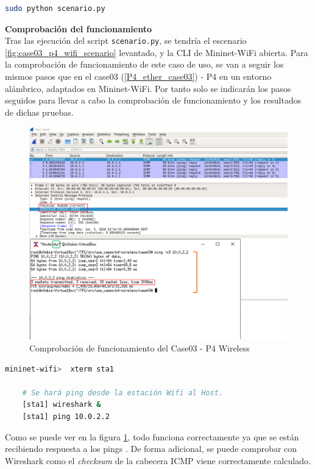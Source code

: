 \begin{lstlisting}[language= bash, style=Consola, caption={Puesta en marcha del escenario  - Case03},label=code:case03_p4_wifi_run]
    sudo python scenario.py
\end{lstlisting}

\vspace{0.4cm}
\textbf{Comprobación del funcionamiento}\\


Tras las ejecución del script \texttt{scenario.py}, se tendría el escenario \ref{fig:case03_p4_wifi_scenario} levantado, y la CLI de Mininet-WiFi abierta. Para la comprobación de funcionamiento de este caso de uso, se van a seguir los mismos pasos que en el case03 (\ref{P4_ether_case03}) - P4 en un entorno alámbrico, adaptados en Mininet-WiFi. Por tanto solo se indicarán los pasos seguidos para llevar a cabo la comprobación de funcionamiento y los resultados de dichas pruebas. 

\begin{figure}[ht]
    \centering
    \includegraphics[width=14cm]{archivos/img/dev/p4-wifi/case03/demo_case03_edited.png}
    \caption{Comprobación de funcionamiento del Case03 - P4 Wireless}
    \label{fig:case03_p4_wifi_func1}
\end{figure}

\begin{lstlisting}[language= bash, style=Consola, caption={Pasos a seguir para comprobar el funcionamiento - Case03},label=code:case03_p4_wifi_func1]
    mininet-wifi>  xterm sta1
    
    # Se hará ping desde la estación Wifi al Host.
    [sta1] wireshark &
    [sta1] ping 10.0.2.2
\end{lstlisting}
\vspace{0.5cm}

Como se puede ver en la figura \ref{fig:case03_p4_wifi_func1}, todo funciona correctamente ya que se están recibiendo respuesta a los pings \hspace{1mm}. De forma adicional, se puede comprobar con Wireshark como el \textit{checksum} de la cabecera ICMP viene correctamente calculado.